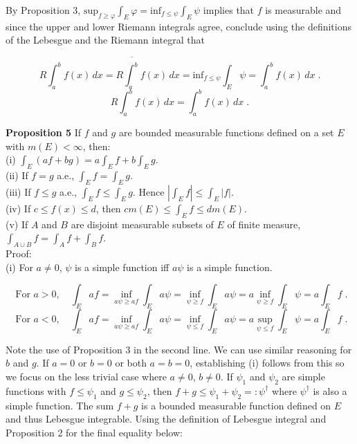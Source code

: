 \documentclass[a4paper]{article}
\begin{document}
By Proposition 3, $\text{sup}_{f\geq \varphi} \int_E \varphi = \text{inf}_{f\leq \psi} \int_E \psi$ implies that $f$ is measurable and since the upper and lower Riemann integrals agree, conclude using the definitions of the Lebesgue and the Riemann integral that

$$R\int_a^b f(x) \, dx = R\overline{\int_a^b} f(x) \, dx = \text{inf}_{f\leq \psi} \int_E \psi = \int_a^b f(x) \, dx \;.$$
$$R\int_a^b f(x) \, dx = \int_a^b f(x) \, dx \;.$$

{\bf Proposition 5} If $f$ and $g$ are bounded measurable functions defined on a set $E$ with $m(E) < \infty$, then:\\

(i) $\int_E (af + bg) = a\int_E f + b\int_E g$.\\

(ii) If $f = g$ a.e., $\int_E f = \int_E g$.\\

(iii) If $f \leq g$ a.e., $\int_E f \leq \int_E g$. Hence $|\int_E f | \leq \int_E |f| $. \\

(iv) If $c \leq f(x) \leq d$, then $cm(E) \leq \int_E f \leq dm(E)$.\\

(v) If $A$ and $B$ are disjoint measurable subsets of $E$ of finite measure, $\int_{A\cup B} f = \int_A f + \int_B f$.  \\

Proof: \\

(i) For $a \neq 0$, $\psi$ is a simple function iff $a\psi$ is a simple function.

$$\text{ For } a > 0, \quad \int_E af = \inf_{a\psi \geq af}  \int_E a\psi  = \inf_{\psi \geq f} \int_E a\psi = a\inf_{\psi \geq f} \int_E \psi = a\int_E f \;.  $$
$$\text{ For } a < 0, \quad \int_E af = \inf_{a\psi \geq af}  \int_E a\psi  = \inf_{\psi \leq f} \int_E a\psi = a\sup_{\psi \leq f}\int_E \psi = a\int_E f \;.  $$

Note the use of Proposition 3 in the second line. We can use similar reasoning for $b$ and $g$. If $a = 0$ or $b = 0$ or both $a= b = 0$, establishing (i) follows from this so we focus on the less trivial case where $a\neq 0$, $b\neq 0$. If $\psi_1$ and $\psi_2$ are simple functions with $f \leq \psi_1$ and $g \leq \psi_2$, then $f+g \leq \psi_1 + \psi_2 =: \psi^\dagger$ where $\psi^\dagger$ is also a simple function. The sum $f+g$ is a bounded measurable function defined on $E$ and thus Lebesgue integrable. Using the definition of Lebesgue integral and Proposition 2 for the final equality below:
\end{document}
